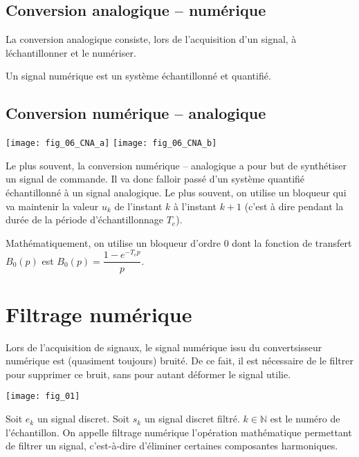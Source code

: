\subsection{Conversion analogique -- numérique}
La conversion analogique consiste, lors de l'acquisition d'un signal, à léchantillonner et le  numériser. 
\begin{defi}

Un signal numérique est un système échantillonné et quantifié. 

\end{defi}

\subsection{Conversion numérique -- analogique}

\begin{marginfigure}
\texttt{[image: fig\_06\_CNA\_a]}
\texttt{[image: fig\_06\_CNA\_b]}
\end{marginfigure}

Le plus souvent, la conversion numérique -- analogique a pour but de synthétiser un signal de commande. Il va donc falloir passé d'un système quantifié échantillonné à un signal analogique. Le plus souvent, on utilise un bloqueur qui va maintenir la valeur $u_k$ de l'instant $k$ à l'instant $k+1$ (c'est à dire pendant la durée de la période d'échantillonnage $T_e$). 

Mathématiquement, on utilise un bloqueur d'ordre 0 dont la fonction de transfert $B_0(p)$ est $B_0(p)=\dfrac{1-e^{-T_e p}}{p}$.


\section{Filtrage numérique}
Lors de l'acquisition de signaux, le signal numérique issu du convertsisseur numérique est (quasiment toujours) bruité. 
De ce fait, il est nécessaire de le filtrer pour supprimer ce bruit, sans pour autant déformer le signal utilie. 

\begin{marginfigure}
\texttt{[image: fig\_01]}
\end{marginfigure}
\begin{defi}
Soit $e_k$ un signal discret. Soit $s_k$ un signal discret filtré. $k\in \mathbb{N}$ est le numéro de l'échantillon. On appelle filtrage numérique l'opération mathématique permettant de filtrer un signal, c'est-à-dire d'éliminer certaines composantes harmoniques. 

\end{defi}

